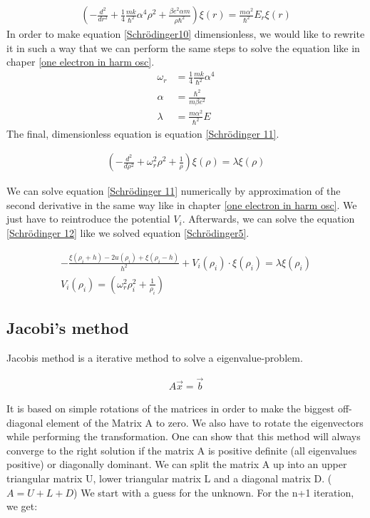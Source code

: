 \documentclass[10pt,a4paper]{article}
\begin{document}
\begin{align}
	\left(-\frac{d^2}{dr^2}+\frac{1}{4}\frac{mk}{\hbar^2} \alpha^4 \rho^2 + \frac{\beta e^2 \alpha m }{\rho \hbar^2} \right) \xi(r) = \frac{m \alpha^2}{\hbar^2} E_r \xi(r) \label{Schrödinger10}
\end{align}
In order to make equation \ref{Schrödinger10} dimensionless, we would like to rewrite it in such a way that we can perform the same steps to solve the equation like in chaper \ref{one electron in harm osc}. 
\begin{align}
	\omega_r &= \frac{1}{4} \frac{mk}{\hbar^2} \alpha^4 \\
	\alpha &=  \frac{\hbar^2}{m \beta e^2} \\
	\lambda &= \frac{m \alpha^2}{\hbar^2} E
\end{align}
The final, dimensionless equation is equation \ref{Schrödinger 11}. 

\begin{align}
	\left(-\frac{d^2}{d \rho^2}+ \omega_r^2 \rho^2 + \frac{1}{\rho} \right) \xi(\rho) = \lambda \xi(\rho) \label{Schrödinger 11}
\end{align}

We can solve equation \ref{Schrödinger 11} numerically by approximation of the second derivative in the same way like in chapter \ref{one electron in harm osc}. We just have to reintroduce the potential $V_i$. Afterwards, we can solve the equation \ref{Schrödinger 12} like we solved equation \ref{Schrödinger5}. 

\begin{align}
	-\frac{\xi(\rho_i+h)-2u(\rho_i)+\xi(\rho_i-h)}{h^2}+V_i(\rho_i) \cdot \xi(\rho_i) = \lambda \xi(\rho_i) \label{Schrödinger 12}\\
	V_i(\rho_i) = \left( \omega_r^2 \rho_i^2 + \frac{1}{\rho_i} \right)
\end{align}


\subsection{Jacobi's method \label{Jacobis method}}

Jacobis method is a iterative method to solve a eigenvalue-problem. 

\begin{align}
	A \vec{x} = \vec{b}
\end{align}

It is based on simple rotations of the matrices in order to make the biggest off-diagonal element of the Matrix A to zero. We also have to rotate the eigenvectors while performing the transformation. One can show that this method will always converge to the right solution if the matrix A is positive definite (all eigenvalues positive) or diagonally dominant. We can split the matrix A up into an upper triangular matrix U, lower triangular matrix L and a diagonal matrix D. ($ A=U + L + D$)
We start with a guess for the unknown. For the n+1 iteration, we get:
\end{document}

